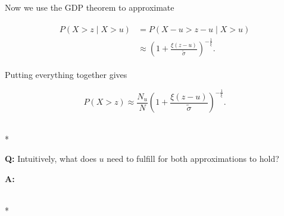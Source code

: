 Now we use the GDP theorem to approximate


\begin{align}
    \begin{split}
        P(X>z \mid X>u) &= P(X-u > z -u \mid X>u)  \\ 
        &\approx \left( 1 + \frac{\xi (z-u)}{\tilde{\sigma}} \right)^{-\frac{1}{\xi}}.
    \end{split}
\end{align}


Putting everything together gives


\begin{equation}
    P(X>z) \approx \frac{N_u}{N}  \left( 1 + \frac{\xi (z-u)}{\tilde{\sigma}} \right)^{-\frac{1}{\xi}}.
\end{equation}


\hrulefill\\*

\textbf{Q:} Intuitively, what does $u$ need to fulfill for both approximations to
hold?

\textbf{A:} 

\hrulefill\\*

